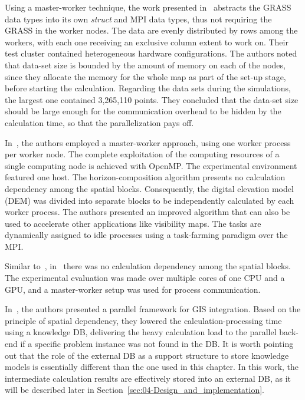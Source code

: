 Using a master-worker technique, the work presented in~\cite{Huang-Explorations_of_the_implementation_of_a_parallel_IDW_algorithm_in_a_Linux_cluster:2011}
abstracts the GRASS data types into its own \emph{struct} and MPI
data types, thus not requiring the GRASS in the worker nodes. The
data are evenly distributed by rows among the workers, with each one
receiving an exclusive column extent to work on. Their test cluster
contained heterogeneous hardware configurations. The authors noted
that data-set size is bounded by the amount of memory on each of the
nodes, since they allocate the memory for the whole map as part of
the set-up stage, before starting the calculation. Regarding the data
sets during the simulations, the largest one contained 3,265,110 points.
They concluded that the data-set size should be large enough for the
communication overhead to be hidden by the calculation time, so that
the parallelization pays off.

In~\cite{Tabik-High_performance_three_horizon_composition_algorithm_for_large_scale_terrains:2011},
the authors employed a master-worker approach, using one worker process
per worker node. The complete exploitation of the computing resources
of a single computing node is achieved with OpenMP. The experimental
environment featured one host. The horizon-composition algorithm presents
no calculation dependency among the spatial blocks. Consequently,
the digital elevation model (DEM)
was divided into separate blocks to be independently calculated by
each worker process. The authors presented an improved algorithm that
can also be used to accelerate other applications like visibility
maps. The tasks are dynamically assigned to idle processes using a
task-farming paradigm over the MPI. 

Similar to~\cite{Tabik-High_performance_three_horizon_composition_algorithm_for_large_scale_terrains:2011},
in~\cite{Tabik-Optimal_tilt_and_orientation_maps_a_multi_algorithm_approach_for_heterogeneous_multicore_GPU_systems:2013}
there was no calculation dependency among the spatial blocks. The
experimental evaluation was made over multiple cores of one CPU and
a GPU, and a master-worker setup was used for process communication.

In~\cite{Yin_A_framework_for_integrating_GIS_and_parallel_computing_for_spatial_control_problems_a_case_study_of_wildfire_dontrol:2012},
the authors presented a parallel framework for GIS integration. Based
on the principle of spatial dependency, they lowered the calculation-processing
time using a knowledge DB, delivering the heavy calculation load to
the parallel back-end if a specific problem instance was not found
in the DB. It is worth pointing out that the role of the external
DB as a support structure to store knowledge models is essentially
different than the one used in this chapter. In this work, the intermediate
calculation results are effectively stored into an external DB, as
it will be described later in Section~\ref{sec:04-Design_and_implementation}.

